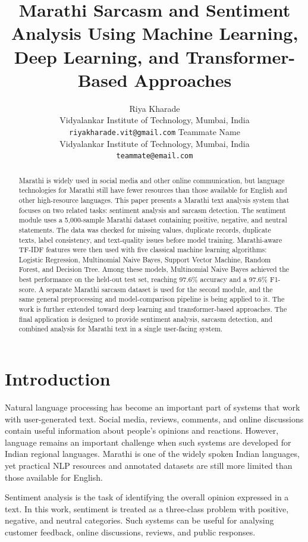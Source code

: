 \documentclass[11pt]{article}
\title{Marathi Sarcasm and Sentiment Analysis Using Machine Learning, Deep Learning, and Transformer-Based Approaches}
\author{Riya Kharade \\
Vidyalankar Institute of Technology, Mumbai, India \\
\texttt{riyakharade.vit@gmail.com}
\And
Teammate Name \\
Vidyalankar Institute of Technology, Mumbai, India \\
\texttt{teammate@email.com}}
\begin{document}
\maketitle

\begin{abstract}
Marathi is widely used in social media and other online communication, but language technologies for Marathi still have fewer resources than those available for English and other high-resource languages. This paper presents a Marathi text analysis system that focuses on two related tasks: sentiment analysis and sarcasm detection. The sentiment module uses a 5,000-sample Marathi dataset containing positive, negative, and neutral statements. The data was checked for missing values, duplicate records, duplicate texts, label consistency, and text-quality issues before model training. Marathi-aware TF-IDF features were then used with five classical machine learning algorithms: Logistic Regression, Multinomial Naive Bayes, Support Vector Machine, Random Forest, and Decision Tree. Among these models, Multinomial Naive Bayes achieved the best performance on the held-out test set, reaching 97.6\% accuracy and a 97.6\% F1-score. A separate Marathi sarcasm dataset is used for the second module, and the same general preprocessing and model-comparison pipeline is being applied to it. The work is further extended toward deep learning and transformer-based approaches. The final application is designed to provide sentiment analysis, sarcasm detection, and combined analysis for Marathi text in a single user-facing system.
\end{abstract}

\section{Introduction}
Natural language processing has become an important part of systems that work with user-generated text. Social media, reviews, comments, and online discussions contain useful information about people's opinions and reactions. However, language remains an important challenge when such systems are developed for Indian regional languages. Marathi is one of the widely spoken Indian languages, yet practical NLP resources and annotated datasets are still more limited than those available for English.

Sentiment analysis is the task of identifying the overall opinion expressed in a text. In this work, sentiment is treated as a three-class problem with positive, negative, and neutral categories. Such systems can be useful for analysing customer feedback, online discussions, reviews, and public responses.
\end{document}
